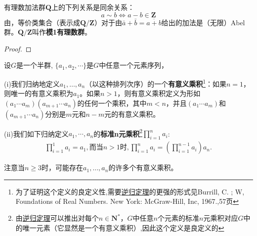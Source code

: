 \documentclass[../../main.tex]{subfiles}
\begin{document}
\begin{example}
有理数加法群$\boldsymbol{Q}$上的下列关系是同余关系：
\[a \sim b \Longleftrightarrow a - b \in \boldsymbol{Z}\]
由，等价类集合（表示成$\boldsymbol{Q}/\boldsymbol{Z}$）对于由$\bar{a} + \bar{b} = \overline{a + b}$给出的加法是（无限）Abel群。$\boldsymbol{Q}/\boldsymbol{Z}$叫作\textbf{模1有理数群}。
\end{example}
\begin{proof}


\end{proof}

\begin{definition}[有意义乘积和标准n元乘积]\label{definition:有意义乘积和标准n元乘积}
设$G$是一个半群, $\{a_1,a_2, \cdots\}$是$G$中任意一个元素序列，

(i)我们归纳地定义$a_1, \dots, a_n$（以这种排列次序）的一个\textbf{有意义乘积}\footnote{为了证明这个定义的良定义性,需要\hyperref[Set Theory-theorem:逆归定理]{逆归定理}的更强的形式见Burrill, C. ; W, Foundations of Real Numbers. New York: McGraw-Hill, Inc, 1967.,57页}：如果$n = 1$，则唯一的有意义乘积为$a_1$。如果$n > 1$，则有意义乘积定义为形如$(a_1 \cdots a_m)(a_{m + 1} \cdots a_n)$的任何一个乘积，其中$m < n$，并且$(a_1 \cdots a_m)$和$(a_{m + 1} \cdots a_n)$分别是$m$元和$n - m$元的有意义乘积。

(ii)我们如下归纳定义$a_1,\cdots,a_n$的\textbf{标准n元乘积}\footnote{由\hyperref[Set Theory-theorem:逆归定理]{逆归定理}可以推出对每个$n \in \boldsymbol{N}^*$，$G$中任意$n$个元素的标准$n$元乘积对应$G$中的唯一元素（它显然是一个有意义乘积）,因此这个定义是良定义的}$\prod_{i=1}^n{a_i}$:
\begin{align*}
\prod_{i=1}^1{a_i}=a_1,\text{而当}n>1\text{时},\prod_{i=1}^n{a_i}=\left( \prod_{i=1}^{n-1}{a_i} \right) a_n.
\end{align*}
\end{definition}
\begin{remark}
注意当$n \geqslant 3$时，可能存在$a_1, \dots, a_n$的许多个有意义乘积。
\end{remark}
\end{document}
